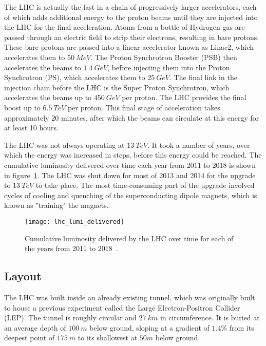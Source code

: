 The LHC is actually the last in a chain of progressively larger accelerators,
each of which adds additional energy to the proton beams until they are injected into the LHC for the final acceleration.
Atoms from a bottle of Hydrogen gas are passed through an electric field to strip their electrons,
resulting in bare protons.
These bare protons are passed into a linear accelerator known as Linac2, which accelerates them to $50~MeV$.
The Proton Synchrotron Booster (PSB) then accelerates the beams to $1.4~GeV$,
before injecting them into the Proton Synchrotron (PS), which accelerates them to $25~GeV$.
The final link in the injection chain before the LHC is the Super Proton Synchrotron,
which accelerates the beams up to $450~GeV$ per proton.
The LHC provides the final boost up to $6.5~TeV$ per proton.
This final stage of acceleration takes approximately 20 minutes, after which the beams can circulate at this energy for
at least 10 hours.

The LHC was not always operating at $13~TeV$.
It took a number of years, over which the energy was increased in steps, before this energy could be reached.
The cumulative luminosity delivered over time each year from 2011 to 2018 is shown in figure~\ref{fig:lhc_lumi_delivered}.
The LHC was shut down for most of 2013 and 2014 for the upgrade to $13~TeV$ to take place.
The most time-consuming part of the upgrade involved cycles of cooling and quenching of the superconducting dipole magnets,
which is known as "training" the magnets.

\begin{figure}[!ht]\centering
\texttt{[image: lhc\_lumi\_delivered]}
\caption{Cumulative luminosity delivered by the LHC over time for each of the years from 2011 to 2018~\cite{lhc-luminosity-public}.}
\label{fig:lhc_lumi_delivered}
\end{figure}

\subsection{Layout}\label{subsec:lhc_layout}

The LHC was built inside an already existing tunnel,
which was originally built to house a previous experiment called the Large Electron-Positron Collider (LEP).
The tunnel is roughly circular and $27~km$ in circumference.
It is buried at an average depth of $100~m$ below ground, sloping at a gradient of $1.4\%$ from its deepest point
of $175~m$ to its shallowest at $50m$ below ground.

